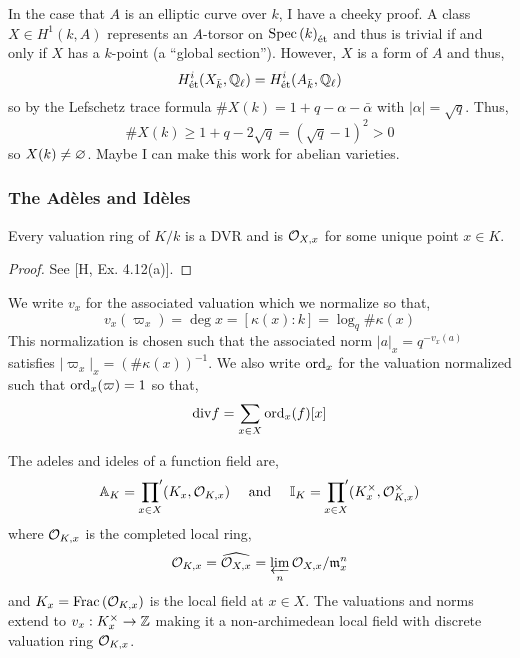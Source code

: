 \documentclass[12pt]{article}
\begin{document}
\begin{rmk}
In the case that $A$ is an elliptic curve over $k$, I have a cheeky proof. A class $X \in H^1(k, A)$ represents an $A$-torsor on $\mathrm{Spec}\left( k \right)_{\text{\'{e}t}}$ and thus is trivial if and only if $X$ has a $k$-point (a ``global section''). However, $X$ is a form of $A$ and thus,
\[ H^i_{\text{\'{e}t}}(X_{\bar{k}}, \mathbb{Q}_\ell) = H^i_{\text{\'{e}t}}(A_{\bar{k}}, \mathbb{Q}_\ell) \]
so by the Lefschetz trace formula $\# X(k) = 1 + q - \alpha - \bar{\alpha}$ with $|\alpha| = \sqrt{q}$. Thus, 
\[ \#X(k) \ge 1 + q - 2 \sqrt{q} = (\sqrt{q}-1)^2 > 0 \] 
so $X(k) \neq \varnothing$. Maybe I can make this work for abelian varieties.
\end{rmk}

\subsubsection{The Ad\`{e}les and Id\`{e}les}

\begin{lemma}
Every valuation ring of $K/k$ is a DVR and is $\mathcal{O}_{X, x}$ for some unique point $x \in K$.
\end{lemma}

\begin{proof}
See [H, Ex. 4.12(a)].
\end{proof}

\begin{rmk}
We write $v_x$ for the associated valuation which we normalize so that, 
\[ v_x(\varpi_x) = \deg{x} = [\kappa(x) : k] = \log_q{\# \kappa(x)} \]
This normalization is chosen such that the associated norm $|a|_x = q^{-v_x(a)}$ satisfies $|\varpi_x|_x = (\# \kappa(x))^{-1}$. We also write $\operatorname{\mathrm{ord}}_x$ for the valuation normalized such that $\operatorname{\mathrm{ord}}_x(\varpi) = 1$ so that,
\[ \mathrm{div}{f} = \sum_{x \in X} \operatorname{\mathrm{ord}}_x(f) [x] \]
\end{rmk}


\renewcommand{\I}{\mathbb{I}}

\begin{defn}
The adeles and ideles of a function field are,
\[ \A_K = \sideset{}{'}\prod_{x \in X} (K_x, \stalk{K}{x}) \quad \text{ and } \quad \I_K = \sideset{}{'}\prod_{x \in X} (K_x^\times, \stalk{K}{x}^\times) \]
where $\mathcal{O}_{K, x}$ is the completed local ring,
\[ \mathcal{O}_{K, x} = \widehat{\mathcal{O}_{X, x}} = \varprojlim_n \mathcal{O}_{X, x} / \mathfrak{m}_x^n \]
and $K_x = \mathrm{Frac}\left(\mathcal{O}_{K, x}\right)$ is the local field at $x \in X$. The valuations and norms extend to $v_x : K_x^\times \to \mathbb{Z}$ making it a non-archimedean local field with discrete valuation ring $\mathcal{O}_{K, x}$.
\end{defn}
\end{document}
